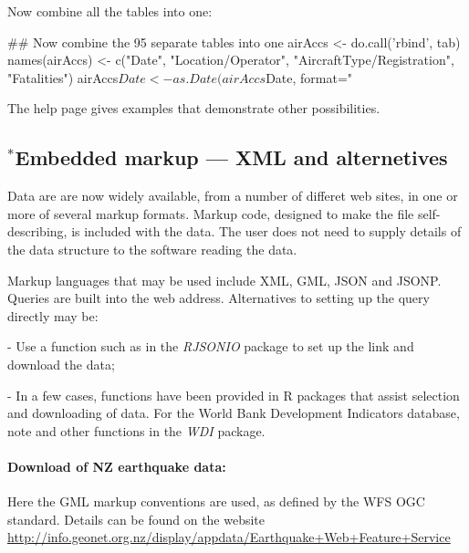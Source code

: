 Now combine all the tables into one:
\begin{fullwidth}

\begin{Schunk}
\begin{Sinput}
## Now combine the 95 separate tables into one
airAccs <- do.call('rbind', tab)
names(airAccs) <- c("Date", "Location/Operator",
                     "AircraftType/Registration", "Fatalities")
airAccs$Date <- as.Date(airAccs$Date, format="%d %b %Y")
\end{Sinput}
\end{Schunk}

\end{fullwidth}

The help page  gives examples that
  demonstrate other possibilities.

\subsection{$^*$Embedded markup --- XML and alternetives}\label{ss:markup}

Data are are now widely available, from a number of differet web
sites, in one or more of several markup formats.  Markup code,
designed to make the file self-describing, is included with the data.
The user does not need to supply details of the data structure to the
software reading the data.

Markup languages that may be used include XML, GML, JSON and JSONP.
Queries are built into the web address.
Alternatives to setting up the query directly may be:
\begin{itemizz}
  \item[-] Use a function such as  in the {\em RJSONIO}
    package to set up the link and download the data;
  \item[-] In a few cases, functions have been provided in R packages
    that assist selection and downloading of data.
    For the World Bank Development Indicators database, note 
    and other functions in the {\em WDI} package.
\end{itemizz}

\paragraph{Download of NZ earthquake data:}
Here the GML markup conventions are used, as defined by
the WFS OGC standard.
Details can be found on the website
  \url{http://info.geonet.org.nz/display/appdata/Earthquake+Web+Feature+Service}

